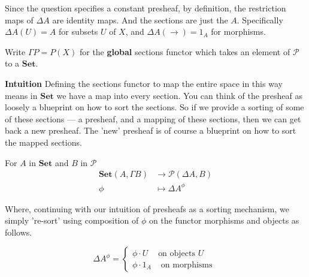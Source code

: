 \documentclass{article}
\begin{document}
Since the question specifies a constant presheaf, by definition, the restriction maps of $\Delta A$ are identity maps. And the sections are just the $A$.
Specifically $\Delta A (U) = A$ for subsets $U$ of $X$, and $\Delta A (\rightarrow) = 1_A$ for morphisms.

Write $\Gamma P = P(X)$ for the \textbf{global} sections functor which takes an element of $\mathcal{P}$ to a $\mathbf{Set}$.

\textbf {Intuition} Defining the sections functor to map the entire space in this way means in $\mathbf{Set}$ we have a map into every section.
You can think of the presheaf as loosely a blueprint on how to sort the sections. So if we provide a sorting of some of these sections — a presheaf, and a mapping of these sections, then we can get back a new presheaf. The ’new’ presheaf is of course a blueprint on how to sort the mapped sections.

For $A$ in $\mathbf{Set}$ and $B$ in $\mathcal{P}$
\begin{align*}
  \mathbf{Set}(A, \Gamma B) &\rightarrow \mathcal{P}(\Delta A, B)\\
  \phi &\mapsto {\Delta A}^{\phi}
\end{align*}

Where, continuing with our intuition of presheafs as a sorting mechanism, we simply 're-sort' using composition of $\phi$ on the functor morphisms and objects as follows.

$${\Delta A}^{\phi} =
\begin{cases}
  \phi \cdot U & \text{on objects } U \\
  \phi \cdot 1_A & \text{ on morphisms }
\end{cases}$$
\end{document}
